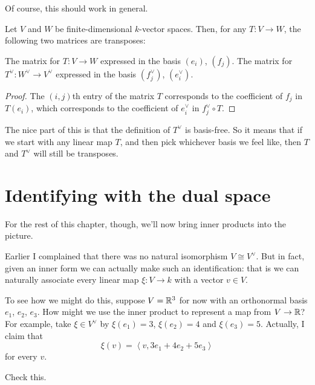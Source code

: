 Of course, this should work in general.
\begin{theorem}
	Let $V$ and $W$ be finite-dimensional $k$-vector spaces.
	Then, for any $T \colon V \to W$,
	the following two matrices are transposes:
	\begin{itemize}
		\ii The matrix for $T \colon V \to W$
		expressed in the basis $(e_i)$, $(f_j)$.
		\ii The matrix for $T^\vee \colon W^\vee \to V^\vee$
		expressed in the basis $(f_j^\vee)$, $(e_i^\vee)$.
	\end{itemize}
\end{theorem}
\begin{proof}
	The $(i,j)$th entry of the matrix $T$
	corresponds to the coefficient of $f_j$ in $T(e_i)$,
	which corresponds to the coefficient of $e_i^\vee$
	in $f_j^\vee \circ T$.
\end{proof}
The nice part of this is that the definition of $T^\vee$ is basis-free.
So it means that if we start with any linear map $T$,
and then pick whichever basis we feel like,
then $T$ and $T^\vee$ will still be transposes.

\section{Identifying with the dual space}
For the rest of this chapter, though,
we'll now bring inner products into the picture.

Earlier I complained that there was no natural isomorphism $V \cong V^\vee$.
But in fact, given an inner form
we can actually make such an identification:
that is we can naturally associate every linear map
$\xi \colon V \to k$ with a vector $v \in V$.

To see how we might do this, suppose $V = \mathbb R^3$
for now with an orthonormal basis $e_1$, $e_2$, $e_3$.
How might we use the inner product to
represent a map from $V \to \mathbb R$?
For example, take $\xi \in V^\vee$ by
$\xi(e_1) = 3$, $\xi(e_2) = 4$ and $\xi(e_3) = 5$.
Actually, I claim that
\[ \xi(v) = \left< v, 3e_1 + 4e_2 + 5e_3 \right> \]
for every $v$.
\begin{ques}
	Check this.
\end{ques}

